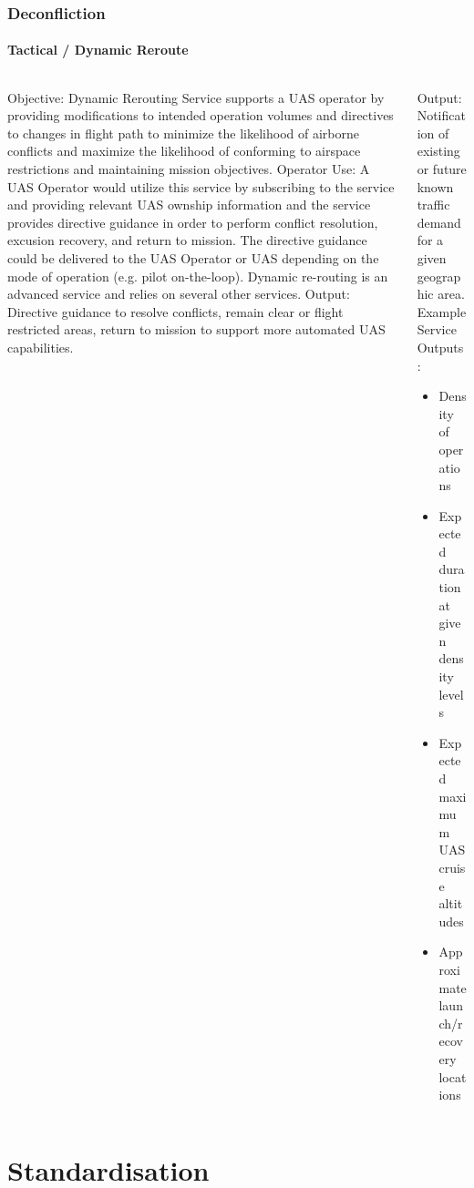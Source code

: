 \documentclass[usenames,dvipsnames,aspectratio=169,serif]{beamer}
\begin{document}
\begin{frame}
   \frametitle{Deconfliction}
   \framesubtitle{Tactical / Dynamic Reroute}
   \begin{columns}[t]
      \begin{column}{0.5\textwidth}
         Objective: Dynamic Rerouting Service supports a UAS operator by providing modifications to intended operation volumes and directives to changes in flight path to minimize the likelihood of airborne conflicts and maximize the likelihood of conforming to airspace restrictions and maintaining mission objectives.
         Operator Use: A UAS Operator would utilize this service by subscribing to the service and providing relevant UAS ownship information and the service provides directive guidance in order to perform conflict resolution, excusion recovery, and return to mission. The directive guidance could be delivered to the UAS Operator or UAS depending on the mode of operation (e.g. pilot on-the-loop). Dynamic re-routing is an advanced service and relies on several other services.
         Output: Directive guidance to resolve conflicts, remain clear or flight restricted areas, return to mission to support more automated UAS capabilities.
      \end{column}
      \begin{column}{0.5\textwidth}
         Output: Notification of existing or future known traffic demand for a given geographic area.
         Example Service Outputs:
         \begin{itemize}
         \item  Density of operations
         \item  Expected duration at given density levels
         \item  Expected maximum UAS cruise altitudes
         \item  Approximate launch/recovery locations
         \end{itemize}
      \end{column}
   \end{columns}
\end{frame}


\section{Standardisation}
\end{document}
